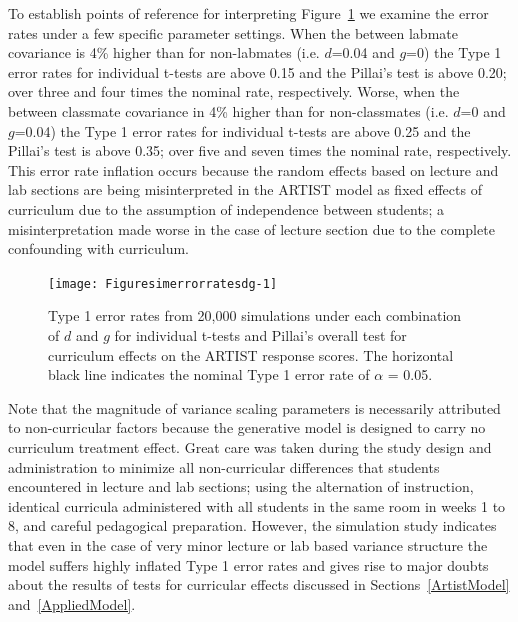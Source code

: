 \documentclass[11pt]{isuthesis}\usepackage[]{graphicx}\usepackage[]{color}
\newenvironment{knitrout}{}{} %
\newcommand{\km}[1]{{\color{red} #1}}
\begin{document}
\km{To establish points of reference for interpreting Figure~\ref{fig:simerrorratesdg} we examine the error rates under a few specific parameter settings. When the between labmate covariance is 4\% higher than for non-labmates (i.e. $d$=0.04 and $g$=0) the Type 1 error rates for individual t-tests are above 0.15 and the Pillai's test is above 0.20; over three and four times the nominal rate, respectively. Worse, when the between classmate covariance in 4\% higher than for non-classmates (i.e. $d$=0 and $g$=0.04) the Type 1 error rates for individual t-tests are above 0.25 and the Pillai's test is above 0.35; over five and seven times the nominal rate, respectively. This error rate inflation occurs because the random effects based on lecture and lab sections are being misinterpreted in the ARTIST model as fixed effects of curriculum due to the assumption of independence between students; a misinterpretation made worse in the case of lecture section due to the complete confounding with curriculum.}

\begin{knitrout}
\color{fgcolor}\begin{figure}[h]

{\centering \texttt{[image: Figuresimerrorratesdg-1]} 

}

\caption[Type 1 error rates from 20,000 simulations under each combination of ]{Type 1 error rates from 20,000 simulations under each combination of $d$ and $g$ for individual t-tests and Pillai's overall test for curriculum effects on the ARTIST response scores. The horizontal black line indicates the nominal Type 1 error rate of $\alpha$ = 0.05.}\label{fig:simerrorratesdg}
\end{figure}


\end{knitrout}

\km{Note that the magnitude of variance scaling parameters is necessarily attributed to non-curricular factors because the generative model is designed to carry no curriculum treatment effect. Great care was taken during the study design and administration to minimize all non-curricular differences that students encountered in lecture and lab sections; using the alternation of instruction, identical curricula administered with all students in the same room in weeks 1 to 8, and careful pedagogical preparation. However, the simulation study indicates that even in the case of very minor lecture or lab based variance structure the model suffers highly inflated Type 1 error rates and gives rise to major doubts about the results of tests for curricular effects discussed in Sections~\ref{ArtistModel} and~\ref{AppliedModel}.}
\end{document}
